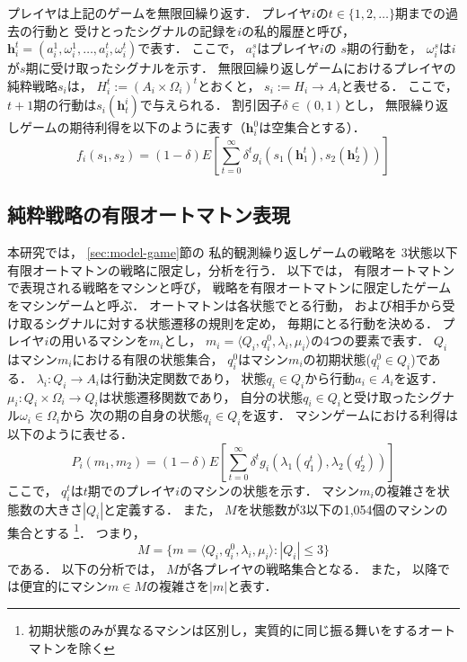 \documentclass[submit]{ipsj}
\theoremstyle{definition}
\begin{document}
プレイヤは上記のゲームを無限回繰り返す．
プレイヤ$i$の$t \in \{1, 2, \ldots\}$期までの過去の行動と
受けとったシグナルの記録を$i$の私的履歴と呼び，
$\bm{h}_{i}^{t} = (a_{i}^{1}, \omega_{i}^{1}, \ldots, a_{i}^{t}, \omega_{i}^{t}) $で表す．
ここで，
$a_{i}^{s}$はプレイヤ$i$の $s$期の行動を，
$\omega_{i}^{s}$は$i$が$s$期に受け取ったシグナルを示す．
無限回繰り返しゲームにおけるプレイヤの純粋戦略$s_i$は，
$H_{i}^t := (A_i \times \Omega_i)^t$とおくと，
$s_i := H_i \rightarrow A_i$と表せる．
ここで，
$t + 1$期の行動は$s_i(\bm{h}_{t}^{i})$で与えられる．
割引因子$\delta \in (0, 1)$とし，
無限繰り返しゲームの期待利得を以下のように表す（$\bm{h}_{i}^{0}$は空集合とする）．
\begin{equation}
  f_i(s_1, s_2) = (1 - \delta) E \left[ \sum_{t=0}^{\infty} \delta^{t} g_i(s_1(\bm{h}_{1}^{t}), s_2(\bm{h}_{2}^{t})) \right] \nonumber
\end{equation}

\subsection{純粋戦略の有限オートマトン表現} \label{sec:model-automata}

本研究では，
\ref{sec:model-game}節の
私的観測繰り返しゲームの戦略を
3状態以下有限オートマトンの戦略に限定し，分析を行う．
以下では，
有限オートマトンで表現される戦略をマシンと呼び，
戦略を有限オートマトンに限定したゲームをマシンゲームと呼ぶ．
オートマトンは各状態でとる行動，
および相手から受け取るシグナルに対する状態遷移の規則を定め，
毎期にとる行動を決める．
プレイヤ$i$の用いるマシンを$m_i$とし，
$m_i = \langle Q_i, q_{i}^{0}, \lambda_i, \mu_i \rangle$の4つの要素で表す．
$Q_i$はマシン$m_i$における有限の状態集合，
$q_{i}^{0}$はマシン$m_i$の初期状態($q_{i}^{0} \in Q_i$)である．
$\lambda_i \colon Q_i \rightarrow A_i$は行動決定関数であり，
状態$q_i \in Q_i$から行動$a_i \in A_i$を返す．
$\mu_i \colon Q_i \times \Omega_i \rightarrow Q_i$は状態遷移関数であり，
自分の状態$q_i \in Q_i$と受け取ったシグナル$\omega_i \in \Omega_i$から
次の期の自身の状態$q_i \in Q_i$を返す．
マシンゲームにおける利得は以下のように表せる．
\begin{equation} \label{eq:machine-game-payoff}
  P_i(m_1, m_2) = (1 - \delta) E \left[ \sum_{t=0}^{\infty} \delta^{t} g_i(\lambda_1(q_{1}^{t}), \lambda_2(q_{2}^{t})) \right]
\end{equation}
ここで，
$q_{i}^{t}$は$t$期でのプレイヤ$i$のマシンの状態を示す．
マシン$m_i$の複雑さを状態数の大きさ$|Q_i|$と定義する．
また，
$M$を状態数が3以下の1,054個のマシンの集合とする
\footnote{初期状態のみが異なるマシンは区別し，実質的に同じ振る舞いをするオートマトンを除く}．
つまり，
\begin{equation}
  M = \{m = \langle Q_i, q_{i}^{0}, \lambda_i, \mu_i \rangle \colon |Q_i| \le 3\} \nonumber
\end{equation}
である．
以下の分析では，
$M$が各プレイヤの戦略集合となる．
また，
以降では便宜的にマシン$m \in M$の複雑さを$|m|$と表す．
\end{document}
